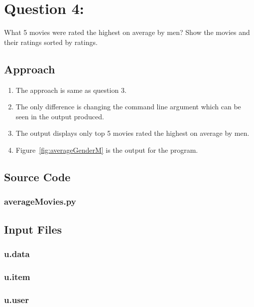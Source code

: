 \documentclass[12pt]{article}
\begin{document}
\section{Question 4:}
What 5 movies were rated the highest on average by men? Show
the movies and their ratings sorted by ratings.
\subsection{Approach}
\begin{enumerate}
    \item The approach is same as question 3. 
    \item The only difference is changing the command line argument which can be seen in the output produced. 
    \item The output displays only top 5 movies rated the highest on average by men.
    \item Figure~\ref{fig:averageGenderM} is the output for the program.
\end{enumerate}

\newpage
\subsection{Source Code}
\subsubsection{averageMovies.py}

\newpage

\subsection{Input Files}
\subsubsection{u.data}

\subsubsection{u.item}

\subsubsection{u.user}

\newpage
\end{document}
